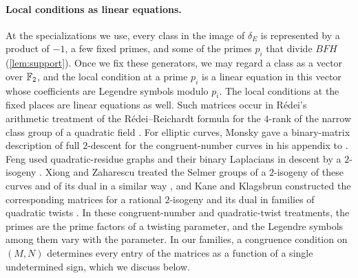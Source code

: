 \paragraph{Local conditions as linear equations.} At the specializations we use, every class in the image of $\delta_E$ is represented by a product of $-1$, a few fixed primes, and some of the primes $p_i$ that divide $BFH$ (\cref{lem:support}). Once we fix these generators, we may regard a class as a vector over $\mathbb F_2$, and the local condition at a prime $p_i$ is a linear equation in this vector whose coefficients are Legendre symbols modulo $p_i$. The local conditions at the fixed places are linear equations as well. Such matrices occur in R\'edei's arithmetic treatment \cite[\S5 and p.~59, footnote~11]{Redei1934} of the R\'edei--Reichardt formula for the $4$-rank of the narrow class group of a quadratic field \cite{RedeiReichardt1934}. For elliptic curves, Monsky gave a binary-matrix description of full $2$-descent for the congruent-number curves in his appendix to \cite[pp.~365--369, especially p.~366]{HeathBrownMonsky1994}. Feng used quadratic-residue graphs and their binary Laplacians in descent by a $2$-isogeny \cite[\S\S2--3]{Feng1996}. Xiong and Zaharescu treated the Selmer groups of a $2$-isogeny of these curves and of its dual in a similar way \cite[\S3.1, Theorem~3]{XiongZaharescu2009}, and Kane and Klagsbrun constructed the corresponding matrices for a rational $2$-isogeny and its dual in families of quadratic twists \cite[\S4]{KaneKlagsbrun2017}. In these congruent-number and quadratic-twist treatments, the primes are the prime factors of a twisting parameter, and the Legendre symbols among them vary with the parameter. In our families, a congruence condition on $(M,N)$ determines every entry of the matrices as a function of a single undetermined sign, which we discuss below.

